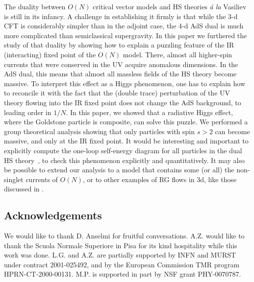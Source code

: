 \documentclass[a4paper,12pt]{article}
\begin{document}
The duality between $O(N)$ critical vector models and HS theories {\em
\'a la} Vasiliev is still in its infancy. A challenge in establishing
it firmly is that while the 3-d CFT is considerably simpler than in
the adjoint case, the 4-d AdS dual is much more complicated than
semiclassical supergravity.  In this paper we furthered the study of
that duality by showing how to explain a puzzling feature of the IR
(interacting) fixed point of the $O(N)$ model.  There, almost all
higher-spin currents that were conserved in the UV acquire anomalous
dimensions. In the AdS dual, this means that almost all massless
fields of the HS theory become massive.  To interpret this effect as a
Higgs phenomenon, one has to explain how to reconcile it with the fact
that the (double trace) perturbation of the UV theory flowing into the
IR fixed point does not change the AdS background, to leading order in
$1/N$. In this paper, we showed that a radiative Higgs effect, where
the Goldstone particle is composite, can solve this puzzle. We
performed a group theoretical analysis showing that only particles
with spin $s>2$ can become massive, and only at the IR fixed point.
It would be interesting and important to explicitly compute the
one-loop self-energy diagram for all particles in the dual HS
theory~\cite{v}, to check this phenomenon explicitly and
quantitatively.  It may also be possible to extend our analysis to a
model that contains some (or all) the non-singlet currents of $O(N)$,
or to other examples of RG flows in 3d, like those discussed in
\cite{anselmi}.

\subsection*{Acknowledgements}
We would like to thank D. Anselmi for fruitful conversations.
A.Z. would like to thank the Scuola Normale Superiore in Pisa 
for its kind hospitality while this work was done.
L.G. and A.Z. are partially
supported by INFN and MURST under contract 2001-025492, and by 
 the European Commission TMR
program HPRN-CT-2000-00131.
M.P. is supported in part by NSF grant PHY-0070787. 
\end{document}
